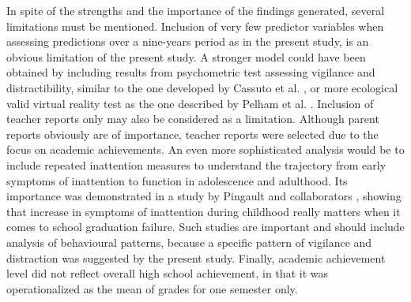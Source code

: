 \documentclass[10pt,letterpaper]{article}
\begin{document}
%

In spite of the strengths and the importance of the findings generated, several limitations must be mentioned. Inclusion of very few predictor variables when assessing predictions over a nine-years period as in the present study, is an obvious limitation of the present study. A stronger model could have been obtained by including results from psychometric test assessing vigilance and distractibility, similar to the one developed by Cassuto et al. \cite{Cassuto2013}, or more ecological valid virtual reality test as the one described by Pelham et al. \cite{Pelham2011}. Inclusion of teacher reports only may also be considered as a limitation. Although parent reports obviously are of importance, teacher reports were selected due to the focus on academic achievements. An even more sophisticated analysis would be to include repeated inattention measures to understand the trajectory from early symptoms of inattention to function in adolescence and adulthood. Its importance was demonstrated in a study by Pingault and collaborators \cite{Pingault2014}, showing that increase in symptoms of inattention during childhood really matters when it comes to school graduation failure. Such studies are important and should include analysis of behavioural patterns, because a specific pattern of vigilance and distraction was suggested by the present study. Finally, academic achievement level did not reflect overall high school achievement, in that it was operationalized as the mean of grades for one semester only.\\


\end{document}
